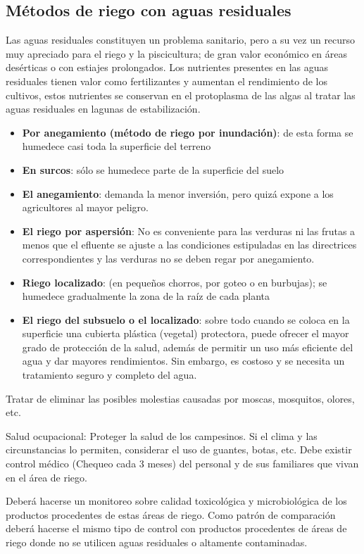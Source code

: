 \subsection{Métodos de riego con aguas residuales}
Las aguas residuales constituyen un problema sanitario, pero a su vez un recurso muy apreciado para el riego y la piscicultura; de gran valor económico en áreas desérticas o con estiajes prolongados. 
Los nutrientes presentes en las aguas residuales tienen valor como fertilizantes y aumentan el rendimiento de los cultivos, estos nutrientes se conservan en el protoplasma de las algas al tratar las aguas residuales en lagunas de estabilización. 
\begin{itemize}
    \item \textbf{Por anegamiento (método de riego por inundación)}: de esta forma se humedece casi toda la superficie del terreno
    \item \textbf{En surcos}: sólo se humedece parte de la superficie del suelo
    \item \textbf{El anegamiento}: demanda la menor inversión, pero quizá expone a los agricultores al mayor peligro.
    \item \textbf{El riego por aspersión}: No es conveniente para las verduras ni las frutas a menos que el efluente se ajuste a las condiciones estipuladas en las directrices correspondientes y las verduras no se deben regar por anegamiento.
    \item \textbf{Riego localizado}:  (en pequeños chorros, por goteo o en burbujas); se humedece gradualmente la zona de la raíz de cada planta
    \item \textbf{El riego del subsuelo o el localizado}: sobre todo cuando se coloca en la superficie una cubierta plástica (vegetal) protectora, puede ofrecer el mayor grado de protección de la salud, además de permitir un uso más eficiente del agua y dar mayores rendimientos. Sin embargo, es costoso y se necesita un tratamiento seguro y completo del agua.
\end{itemize}
Tratar de eliminar las posibles molestias causadas por moscas, mosquitos, olores, etc.

Salud ocupacional: Proteger la salud de los campesinos. Si el clima y las circunstancias lo permiten, considerar el uso de guantes, botas, etc. Debe existir control médico (Chequeo cada 3 meses) del personal y de sus familiares que vivan en el área de riego. 

Deberá hacerse un monitoreo sobre calidad toxicológica y microbiológica de los productos procedentes de estas áreas de riego. Como patrón de comparación deberá hacerse el mismo tipo de control con productos procedentes de áreas de riego donde no se utilicen aguas residuales o altamente contaminadas. 

